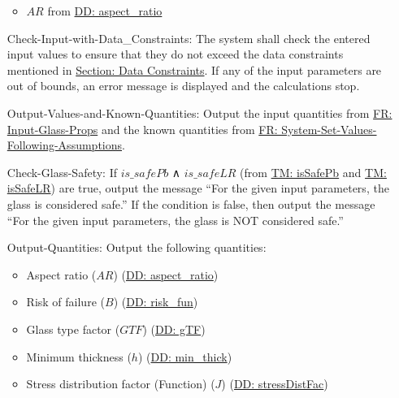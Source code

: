 \documentclass[12pt]{article}
\begin{document}
\begin{itemize}
\begin{itemize}
                                                                                                \item{$AR$ from \hyperref[DD:aspect.ratio]{DD: aspect\_ratio}}
                                                                                                \end{itemize}
\item[Check-Input-with-Data\_Constraints:\phantomsection\label{checkInputWithDataCons}]The system shall check the entered input values to ensure that they do not exceed the data constraints mentioned in \hyperref[Sec:DataConstraints]{Section: Data Constraints}. If any of the input parameters are out of bounds, an error message is displayed and the calculations stop.
\item[Output-Values-and-Known-Quantities:\phantomsection\label{outputValsAndKnownQuants}]Output the input quantities from \hyperref[inputGlassProps]{FR: Input-Glass-Props} and the known quantities from \hyperref[sysSetValsFollowingAssumps]{FR: System-Set-Values-Following-Assumptions}.
\item[Check-Glass-Safety:\phantomsection\label{checkGlassSafety}]If $is\_safePb$ ∧ $is\_safeLR$ (from \hyperref[TM:isSafePb]{TM: isSafePb} and \hyperref[TM:isSafeLR]{TM: isSafeLR}) are true, output the message ``For the given input parameters, the glass is considered safe.'' If the condition is false, then output the message ``For the given input parameters, the glass is NOT considered safe.''
\item[Output-Quantities:\phantomsection\label{outputQuants}]Output the following quantities:
                                                            \begin{itemize}
                                                            \item{Aspect ratio ($AR$) (\hyperref[DD:aspect.ratio]{DD: aspect\_ratio})}
                                                            \item{Risk of failure ($B$) (\hyperref[DD:risk.fun]{DD: risk\_fun})}
                                                            \item{Glass type factor ($GTF$) (\hyperref[DD:gTF]{DD: gTF})}
                                                            \item{Minimum thickness ($h$) (\hyperref[DD:min.thick]{DD: min\_thick})}
                                                            \item{Stress distribution factor (Function) ($J$) (\hyperref[DD:stressDistFac]{DD: stressDistFac})}

\end{itemize}
\end{itemize}
\end{document}
